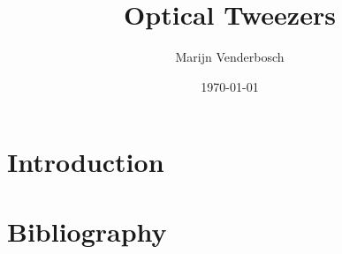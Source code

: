 \documentclass[a4paper,11pt,twoside]{report}
\title{
	\Huge{\textsf{Optical Tweezers}}
}
\author{
	\large \textsf{Marijn Venderbosch}
}
\date{\normalsize \textsf{\today}}
\begin{document}
	
	
	
	
	
	
	\tableofcontents
	\newpage
	
	
	
	
	
	\chapter{Introduction}\label{introduction}
	
	
	
	\clearpage
	\chapter*{Bibliography}
	
	\printbibliography[heading=none]
	
	
	
	\begin{appendices}
		
		\renewcommand{\thesection}{A.\arabic{section}}
		\renewcommand\thefigure{A.\arabic{figure}}
		\renewcommand\theequation{A.\arabic{equation}}
		
		\setcounter{equation}{0}
		\setcounter{figure}{0}
		
		
		
	\end{appendices}
	
	
	
	
\end{document}
